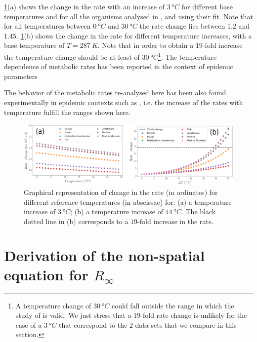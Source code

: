 \cref{fig:rate_changes}(a) shows the change in the rate with an increase of
$\SI{3}{\degree C}$ for different base temperatures and for all the organisms
analysed in \cite{Gillooly2248}, and using their fit. Note that for all
temperatures between $\SI{0}{\degree C}$  and $\SI{30}{\degree C}$ the rate
change lies between $1.2$ and $1.45$. \cref{fig:rate_changes}(b) shows the
change in the rate for different temperature increases, with a base temperature
of $T=\SI{287}{K}$. Note that in order to obtain a $19$-fold increase the
temperature change should be at least of $\SI{30}{\degree C}$\footnote{A
    temperature change of $\SI{30}{\degree C}$ could fall outside the range in
    which the study of \cite{Gillooly2248} is valid. We just stress that a
    $19$-fold rate change is unlikely for the case of a $\SI{3}{\degree C}$
    that
    correspond to the $2$ data sets that we compare in this section.}.
The temperature dependence of metabolic rates has been reported in the
context of epidemic parameters \cite{COELHO2006,Shapiro2017}

The behavior of the metabolic rates re-analysed here has been also found
experimentally in epidemic contexts such as \cite{COELHO2006, Shapiro2017},
i.e. the increase of the rates with temperature fulfill the ranges shown here.

\begin{figure}[H]
    \centering
    \includegraphics[width=1\textwidth]{Figures/arrhenius.png}
    \caption[Dependence of metabolic rates on temperature]{Graphical
        representation of change in the rate (in ordinates)
        for different reference temperatures (in abscissae) for: (a) a
        temperature
        increase of $\SI{3}{\degree C}$; (b)  a temperature increase of
        $\SI{14}{\degree C}$. The black dotted line in (b) corresponds to a
        $19$-fold
        increase in the rate.
    }
    \label{fig:rate_changes}
\end{figure}

\section{Derivation of the non-spatial equation for $R_{\infty}$}
\label{app:Rinf}


